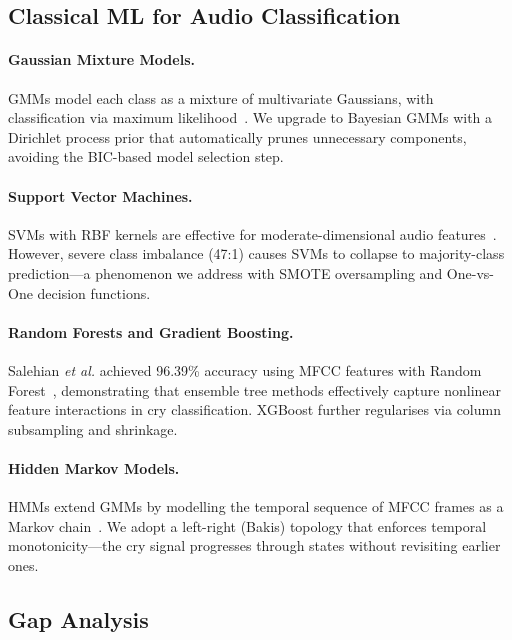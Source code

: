 \documentclass[11pt,a4paper]{article}
\begin{document}
\subsection{Classical ML for Audio Classification}

\paragraph{Gaussian Mixture Models.}
GMMs model each class as a mixture of multivariate Gaussians, with
classification via maximum likelihood~\cite{reynolds2000speaker}. We
upgrade to Bayesian GMMs with a Dirichlet process prior that
automatically prunes unnecessary components, avoiding the BIC-based
model selection step.

\paragraph{Support Vector Machines.}
SVMs with RBF kernels are effective for moderate-dimensional audio
features~\cite{chang2011libsvm}. However, severe class imbalance
(47:1) causes SVMs to collapse to majority-class prediction---a
phenomenon we address with SMOTE oversampling and One-vs-One decision
functions.

\paragraph{Random Forests and Gradient Boosting.}
Salehian \textit{et al.} achieved 96.39\% accuracy using MFCC features
with Random Forest~\cite{salehian2022infant}, demonstrating that
ensemble tree methods effectively capture nonlinear feature interactions
in cry classification. XGBoost further regularises via column
subsampling and shrinkage.

\paragraph{Hidden Markov Models.}
HMMs extend GMMs by modelling the temporal sequence of MFCC frames as a
Markov chain~\cite{rabiner1989hmm}. We adopt a left-right (Bakis)
topology that enforces temporal monotonicity---the cry signal progresses
through states without revisiting earlier ones.

\subsection{Gap Analysis}
\end{document}
